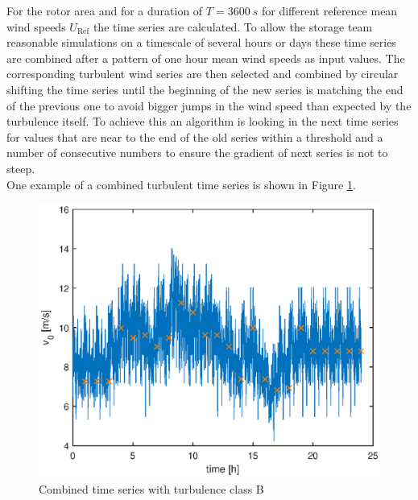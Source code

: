 For the rotor area and for a duration of $T = \SI{3600}{s}$ for different reference mean wind speeds $U_{\text{Ref}}$ the time series are calculated. To allow the storage team reasonable simulations on a timescale of several hours or days these time series are combined after a pattern of one hour mean wind speeds as input values. The corresponding turbulent wind series are then selected and combined by circular shifting the time series until the beginning of the new series is matching the end of the previous one to avoid bigger jumps in the wind speed than expected by the turbulence itself. To achieve this an algorithm is looking in the next time series for values that are near to the end of the old series within a threshold and a number of consecutive numbers to ensure the gradient of next series is not to steep. \\
One example of a combined turbulent time series is shown in Figure \ref{fig:TurbWindField}.
\begin{figure}[tbh]
	\centering	
	\includegraphics[width=12cm]{Figures/TurbWindField.eps}
	\caption{Combined time series with turbulence class B}
	\label{fig:TurbWindField}
\end{figure}    
